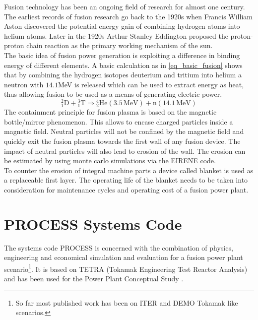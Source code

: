 	Fusion technology has been an ongoing field of research for almost one century. The earliest records of fusion research go back to the 1920s when Francis William Aston discovered the potential energy gain of combining hydrogen atoms into helium atoms. Later in the 1920s Arthur Stanley Eddington proposed the proton-proton chain reaction as the primary working mechanism of the sun.\\
	The basic idea of fusion power generation is exploiting a difference in binding energy of different elements. A basic calculation as in \ref{eq_basic_fusion} shows that by combining the hydrogen isotopes deuterium and tritium into helium a neutron with $14.1$\.MeV is released which can be used to extract energy as heat, thus allowing fusion to be used as a means of generating electric power.
	\begin{equation}
		{}^2_1\textrm{D} + {}^3_1\textrm{T} \Rightarrow {}^4_2\textrm{He} (3.5\,\textrm{MeV}) + \textrm{n} (14.1\,\textrm{MeV})
		\label{eq_basic_fusion}
	\end{equation}
	The containment principle for fusion plasma is based on the magnetic bottle/mirror phenomenon. This allows to encase charged particles inside a magnetic field. Neutral particles will not be confined by the magnetic field and quickly exit the fusion plasma towards the first wall of any fusion device. The impact of neutral particles will also lead to erosion of the wall. The erosion can be estimated by using monte carlo simulations via the EIRENE \cite{EIRENE} code.\\
	To counter the erosion of integral machine parts a device called blanket is used as a replaceable first layer. The operating life of the blanket needs to be taken into consideration for maintenance cycles and operating cost of a fusion power plant.
	
	\section{PROCESS Systems Code}
	The systems code PROCESS\cite{process} is concerned with the combination of physics, engineering and economical simulation and evaluation for a fusion power plant scenario\footnote{So far most published work has been on ITER and DEMO Tokamak like scenarios.}. It is based on TETRA (Tokamak Engineering Test Reactor Analysis) \cite{TETRA} and has been used for the Power Plant Conceptual Study \cite{PPCS}.\\
	
